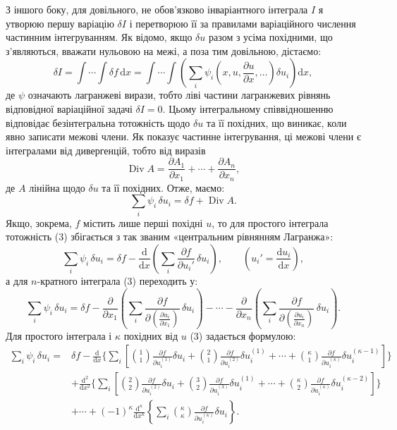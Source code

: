 \documentclass[11pt]{article}
\providecommand{\p}{\partial}
\providecommand{\dd}{\mathrm d}
\DeclareMathOperator{\Div}{Div}
\begin{document}
З іншого боку, для довільного, не обов'язково інваріантного інтеграла \(I\) я утворюю першу варіацію \(\delta I\) і перетворюю її за правилами варіаційного числення частинним інтегруванням. Як відомо, якщо \(\delta u\) разом з усіма похідними, що з'являються, вважати нульовою на межі, а поза тим довільною, дістаємо:
\begin{equation}
\delta I=\int\!\cdots\!\int \delta f\,\dd x
=\int\!\cdots\!\int\left(\sum_i\psi_i\!\left(x,u,\frac{\p u}{\p x},\ldots\right)\delta u_i\right)\dd x,
\tag{2}
\end{equation}
де \(\psi\) означають лагранжеві вирази, тобто ліві частини лагранжевих рівнянь відповідної варіаційної задачі \(\delta I=0\). Цьому інтегральному співвідношенню відповідає безінтегральна тотожність щодо \(\delta u\) та її похідних, що виникає, коли явно записати межові члени. Як показує частинне інтегрування, ці межові члени є інтегралами від дивергенцій, тобто від виразів
\[
\Div A=\frac{\p A_1}{\p x_1}+\cdots+\frac{\p A_n}{\p x_n},
\]
де \(A\) лінійна щодо \(\delta u\) та її похідних. Отже, маємо:
\begin{equation}
\sum_i\psi_i\,\delta u_i=\delta f+\Div A.
\tag{3}
\end{equation}
Якщо, зокрема, \(f\) містить лише перші похідні \(u\), то для простого інтеграла тотожність (3) збігається з так званим «центральним рівнянням Лагранжа»:
\begin{equation}
\sum_i \psi_i\,\delta u_i
=\delta f-\frac{\dd}{\dd x}\left(\sum_i\frac{\p f}{\p u_i'}\,\delta u_i\right),
\qquad \left(u_i'=\frac{\dd u_i}{\dd x}\right),
\tag{4}
\end{equation}
а для \(n\)-кратного інтеграла (3) переходить у:
\begin{equation}
\sum_i\psi_i\,\delta u_i
=
\delta f
-\frac{\p}{\p x_1}\left(\sum_i\frac{\p f}{\p \left(\frac{\p u_i}{\p x_1}\right)}\,\delta u_i\right)
-\cdots
-\frac{\p}{\p x_n}\left(\sum_i\frac{\p f}{\p \left(\frac{\p u_i}{\p x_n}\right)}\,\delta u_i\right).
\tag{5}
\end{equation}
Для простого інтеграла і \(\kappa\) похідних від \(u\) (3) задається формулою:
\begin{equation}
\begin{aligned}
\sum_i\psi_i\,\delta u_i
={}&\delta f
-\frac{\dd}{\dd x}\Bigg\{\sum_i\left[
\binom{1}{1}\frac{\p f}{\p u_i^{(1)}}\delta u_i
+\binom{2}{1}\frac{\p f}{\p u_i^{(2)}}\delta u_i^{(1)}
+\cdots+
\binom{\kappa}{1}\frac{\p f}{\p u_i^{(\kappa)}}\delta u_i^{(\kappa-1)}
\right]\Bigg\}\\
&+\frac{\dd^2}{\dd x^2}\Bigg\{\sum_i\left[
\binom{2}{2}\frac{\p f}{\p u_i^{(2)}}\delta u_i
+\binom{3}{2}\frac{\p f}{\p u_i^{(3)}}\delta u_i^{(1)}
+\cdots+
\binom{\kappa}{2}\frac{\p f}{\p u_i^{(\kappa)}}\delta u_i^{(\kappa-2)}
\right]\Bigg\}\\
&+\cdots
+(-1)^\kappa\frac{\dd^\kappa}{\dd x^\kappa}
\left\{\sum_i\binom{\kappa}{\kappa}
\frac{\p f}{\p u_i^{(\kappa)}}\delta u_i\right\}.
\end{aligned}
\tag{6}
\end{equation}
\end{document}
